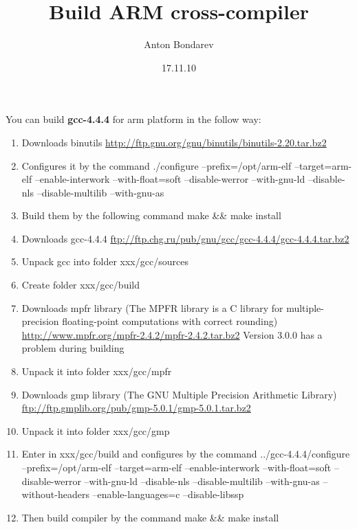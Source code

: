 \documentclass[12pt]{article}
\title{Build ARM cross-compiler}
\date{17.11.10}
\author{Anton Bondarev}
\begin{document}
You can build \textbf{gcc-4.4.4} for arm platform in the follow way:
\begin{enumerate}
\item Downloads binutils
    \href{url}{http://ftp.gnu.org/gnu/binutils/binutils-2.20.tar.bz2}
\item Configures it by the command
    ./configure --prefix=/opt/arm-elf --target=arm-elf --enable-interwork --with-float=soft --disable-werror --with-gnu-ld --disable-nls --disable-multilib --with-gnu-as
\item Build them by the following command
    make \&\& make install
\item  Downloads gcc-4.4.4
    \href{url}{ftp://ftp.chg.ru/pub/gnu/gcc/gcc-4.4.4/gcc-4.4.4.tar.bz2}
\item Unpack gcc into folder xxx/gcc/sources
\item Create folder xxx/gcc/build
\item Downloads mpfr library (The MPFR library is a C library for multiple-precision floating-point computations with correct rounding)
    \href{url}{http://www.mpfr.org/mpfr-2.4.2/mpfr-2.4.2.tar.bz2}
    Version 3.0.0 has a problem during building
\item Unpack it into folder xxx/gcc/mpfr
\item Downloads gmp library (The GNU Multiple Precision Arithmetic Library)
    \href{url}{ftp://ftp.gmplib.org/pub/gmp-5.0.1/gmp-5.0.1.tar.bz2}
\item Unpack it into folder xxx/gcc/gmp
\item Enter in xxx/gcc/build and configures by the command
    ../gcc-4.4.4/configure --prefix=/opt/arm-elf --target=arm-elf --enable-interwork --with-float=soft --disable-werror --with-gnu-ld --disable-nls --disable-multilib --with-gnu-as --without-headers --enable-languages=c --disable-libssp
\item Then build compiler by the command
    make \&\& make install
\end{enumerate}
\end{document}
